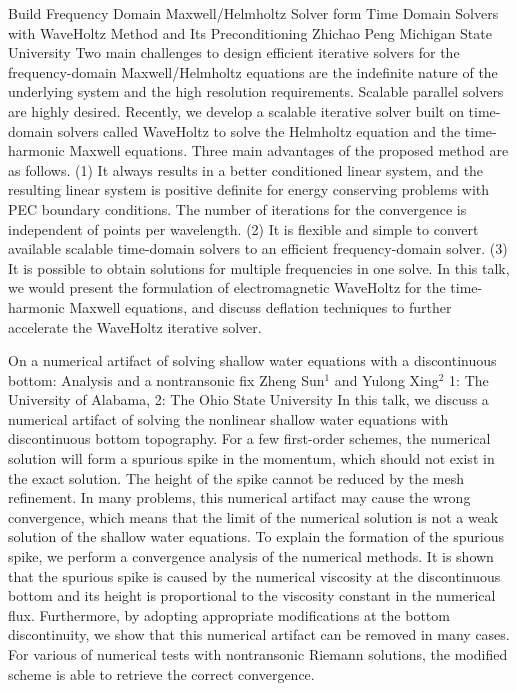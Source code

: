 \begin{addmargin}[2em]{0em}
\vspace{1.5ex}
\abs
{Build Frequency Domain Maxwell/Helmholtz Solver form Time Domain Solvers with WaveHoltz Method and Its Preconditioning}
{Zhichao Peng}
{Michigan State University}
{Two main challenges to design efficient iterative solvers for the frequency-domain Maxwell/Helmholtz equations are the indefinite nature of the underlying system and the high resolution requirements. Scalable parallel solvers are highly desired. Recently, we develop a scalable iterative solver built on time-domain solvers called WaveHoltz to solve the Helmholtz equation and the time-harmonic Maxwell equations. Three main advantages of the proposed method are as follows. (1) It always results in a better conditioned linear system, and the resulting linear system is positive definite for energy conserving problems with PEC boundary conditions. The number of iterations for the convergence is independent of points per wavelength. (2) It is flexible and simple to convert available scalable time-domain solvers to an efficient frequency-domain solver. (3) It is possible to obtain solutions for multiple frequencies in one solve.  In this talk, we would present the formulation of electromagnetic WaveHoltz for the time-harmonic Maxwell equations, and discuss deflation techniques to further accelerate the WaveHoltz iterative solver.}


\vspace{1.5ex}
\abs
{On a numerical artifact of solving shallow water equations with a discontinuous bottom: Analysis and a nontransonic fix}
{Zheng Sun$^{1}$ and Yulong Xing$^{2}$}
{1: The University of Alabama, 2: The Ohio State University}
{In this talk, we discuss a numerical artifact of solving the nonlinear shallow water equations with discontinuous bottom topography. For a few first-order schemes, the numerical solution will form a spurious spike in the momentum, which should not exist in the exact solution. The height of the spike cannot be reduced by the mesh refinement. In many problems, this numerical artifact may cause the wrong convergence, which means that the limit of the numerical solution is not a weak solution of the shallow water equations. To explain the formation of the spurious spike, we perform a convergence analysis of the numerical methods. It is shown that the spurious spike is caused by the numerical viscosity at the discontinuous bottom and its height is proportional to the viscosity constant in the numerical flux. Furthermore, by adopting appropriate modifications at the bottom discontinuity, we show that this numerical artifact can be removed in many cases. For various of numerical tests with nontransonic Riemann solutions, the modified scheme is able to retrieve the correct convergence.}



\end{addmargin}
